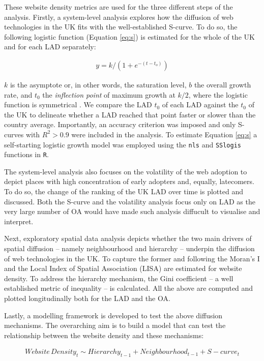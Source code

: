 \documentclass[
  authoryear,
  preprint,
  3p]{elsarticle}
\begin{document}
These website density metrics are used for the three different steps of
the analysis. Firstly, a system-level analysis explores how the
diffusion of web technologies in the UK fits with the well-established
S-curve. To do so, the following logistic function (Equation \ref{eq:s})
is estimated for the whole of the UK and for each LAD separately:

\begin{align}
y = k /(1 + e^{-(t-t_{o})})\label{eq:s}
\end{align}

\noindent \(k\) is the asymptote or, in other words, the saturation
level, \(b\) the overall growth rate, and \(t_{0}\) the \emph{inflection
point} of maximum growth at \(k/2\), where the logistic function is
symmetrical \citep{wilson201281}. We compare the LAD \(t_0\) of each LAD
against the \(t_0\) of the UK to delineate whether a LAD reached that
point faster or slower than the country average. Importantly, an
accuracy criterion was imposed and only S-curves with \(R^2 > 0.9\) were
included in the analysis. To estimate Equation \ref{eq:s} a
self-starting logistic growth model was employed using the \texttt{nls}
and \texttt{SSlogis} functions in \texttt{R}.

The system-level analysis also focuses on the volatility of the web
adoption to depict places with high concentration of early adopters and,
equally, latecomers. To do so, the change of the ranking of the UK LAD
over time is plotted and discussed. Both the S-curve and the volatility
analysis focus only on LAD as the very large number of OA would have
made such analysis diffucult to visualise and interpret.

Next, exploratory spatial data analysis depicts whether the two main
drivers of spatial diffusion -- namely neighbourhood and hierarchy --
underpin the diffusion of web technologies in the UK. To capture the
former and following \citet{ding2010modeling} the Moran's I and the
Local Index of Spatial Association (LISA) are estimated for website
density. To address the hierarchy mechanism, the Gini coefficient -- a
well established metric of inequality -- is calculated. All the above
are computed and plotted longitudinally both for the LAD and the OA.

Lastly, a modelling framework is developed to test the above diffusion
mechanisms. The overarching aim is to build a model that can test the
relationship between the website density and these mechanisms:

\begin{align}
Website\,Density_{t} \sim Hierarchy_{t-1} + Neighbourhood_{t-1} + S-curve_{t}\label{eq:rf.generic}
\end{align}
\end{document}
